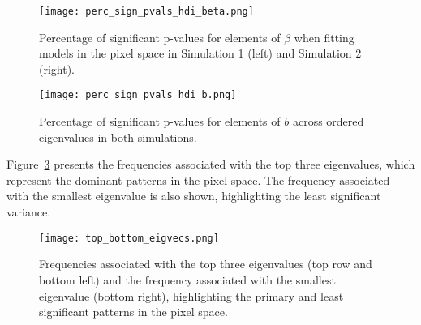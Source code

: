 \documentclass[12pt]{article}
\begin{document}
\begin{figure}[h!]
	\centering
	\texttt{[image: perc\_sign\_pvals\_hdi\_beta.png]}
	\caption{Percentage of significant p-values for elements of \( \beta \) when fitting models in the pixel space in
		Simulation 1 (left) and Simulation 2 (right).}
	\label{fig:perc_sign_beta}
\end{figure}

\begin{figure}[h!]
	\centering
	\texttt{[image: perc\_sign\_pvals\_hdi\_b.png]}
	\caption{Percentage of significant p-values for elements of \( b \) across ordered eigenvalues in both simulations.}
	\label{fig:perc_sign_b}
\end{figure}

\FloatBarrier

Figure~\ref*{fig:top_bottom_eigvecs} presents the frequencies associated with the top three eigenvalues, which represent the dominant patterns in the pixel space. The frequency associated with the smallest eigenvalue is also shown, highlighting the least significant variance.

\begin{figure}[h!]
	\centering
	\texttt{[image: top\_bottom\_eigvecs.png]}
	\caption{Frequencies associated with the top three eigenvalues (top row and bottom left) and the frequency associated with the smallest eigenvalue (bottom right), highlighting the primary and least significant patterns in the pixel space.}
	\label{fig:top_bottom_eigvecs}
\end{figure}
\end{document}
